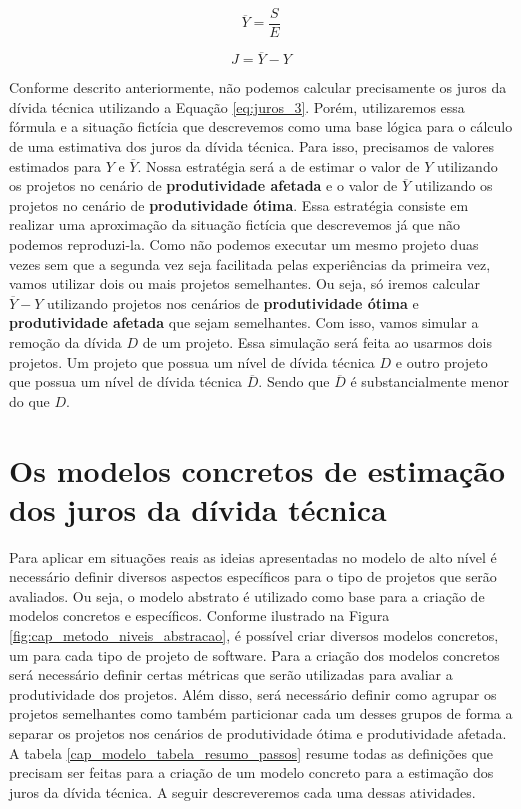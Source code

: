 \begin{equation}
\label{eq:juros_2}
\overline{Y} =  \frac{S}{E}
\end{equation}


\begin{equation}
\label{eq:juros_3}
J = \overline{Y} - Y
\end{equation}



Conforme descrito anteriormente, não podemos calcular precisamente os juros da dívida técnica utilizando a Equação \ref{eq:juros_3}. Porém, utilizaremos essa fórmula e a situação fictícia que descrevemos como uma base lógica para o cálculo de uma estimativa dos juros da dívida técnica. Para isso, precisamos de valores estimados para $Y$ e $\overline{Y}$. Nossa estratégia será a de estimar o valor de $Y$ utilizando os projetos no cenário de \textbf{produtividade afetada} e o valor de $\overline{Y}$ utilizando os projetos no cenário de  \textbf{produtividade ótima}. Essa estratégia consiste em realizar uma aproximação da situação fictícia que descrevemos já que não podemos reproduzi-la.  Como não podemos executar um mesmo projeto duas vezes sem que a segunda vez seja facilitada pelas experiências da primeira vez, vamos utilizar dois ou mais projetos semelhantes.  Ou seja, só iremos calcular  $\overline{Y} - Y$ utilizando projetos nos cenários de \textbf{produtividade ótima} e \textbf{produtividade afetada} que sejam semelhantes. Com isso, vamos simular a remoção da dívida $D$ de um projeto. Essa simulação será feita ao usarmos dois projetos. Um projeto que possua um nível de dívida técnica $D$ e outro projeto que possua um nível de dívida técnica $\overline{D}$. Sendo que $\overline{D}$ é substancialmente menor do que $D$. 
 

 
 
 
 \section{Os modelos concretos de estimação dos juros da dívida técnica}
 
 Para aplicar em situações reais as ideias apresentadas no modelo de alto nível é necessário definir diversos aspectos específicos para o tipo de projetos que serão avaliados. Ou seja,  o modelo abstrato é utilizado como base para a criação de modelos concretos e específicos. Conforme ilustrado na Figura \ref{fig:cap_metodo_niveis_abstracao}, é possível criar diversos modelos concretos, um para cada tipo de projeto de software. Para a criação dos modelos concretos será necessário definir certas métricas que serão utilizadas para avaliar a produtividade dos projetos. Além disso, será necessário definir como agrupar os projetos semelhantes como também particionar cada um desses grupos de forma a separar os projetos nos cenários de produtividade ótima e produtividade afetada. A tabela \ref{cap_modelo_tabela_resumo_passos} resume todas as definições que precisam ser feitas para a criação de um modelo concreto para a estimação dos juros da dívida técnica.  A seguir descreveremos cada uma dessas atividades.
 
